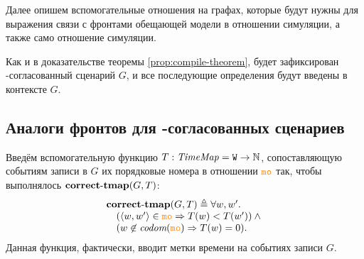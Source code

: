   Далее опишем вспомогательные отношения на графах, которые будут нужны для выражения связи 
с фронтами обещающей модели в отношении симуляции, а также  само отношение симуляции.
  
Как и в доказательстве теоремы \ref{prop:compile-theorem}, будет зафиксирован \ARM-согласованный сценарий $G$, и все последующие определения будут введены в контексте $G$.
  
\subsection{Аналоги фронтов для \ARM-согласованных сценариев}
\label{sec:view}
  Введём вспомогательную функцию $T: \mathit{TimeMap} = {\mathtt{W}} \rightarrow \mathbb{N}$,
  сопоставляющую событиям записи в $G$ их порядковые номера в отношении $\lCO$ так, чтобы  выполнялось ${\rm \bf correct\text{-}tmap}(G, T)$:
  \[\inarr{
    \correctTmap(G, T) \defeq \forall w, w'. \; \\
    \quad (\tup{w, w'} \in \lCO \implies T(w) < T(w')) \land {} \\
    \quad (w \nin \codom{\lCO} \implies T(w) = 0).
  }\]
  Данная функция, фактически, вводит метки времени на событиях записи $G$.
  
